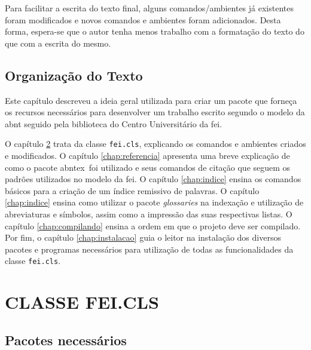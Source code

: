 \documentclass[xindy,draft]{fei}
\begin{document}
Para facilitar a escrita do texto final, alguns comandos/ambientes já existentes foram modificados e novos comandos e ambientes foram adicionados. Desta forma, espera-se que o autor tenha menos trabalho com a formatação do texto do que com a escrita do mesmo.

\section{Organização do Texto}

Este capítulo descreveu a ideia geral utilizada para criar um pacote que forneça os recursos necessários para desenvolver um trabalho escrito segundo o modelo da \gls{abnt} seguido pela biblioteca do Centro Universitário da \gls{fei}.

O capítulo \ref{chap:classe} trata da classe \texttt{fei.cls}, explicando os comandos e ambientes criados e modificados. O capítulo \ref{chap:referencia} apresenta uma breve explicação de como o pacote \gls{abntex}~foi utilizado e seus comandos de citação que seguem os padrões utilizados no modelo da \gls{fei}. O capítulo \ref{chap:indice} ensina os comandos básicos para a criação de um índice remissivo de palavras. O capítulo \ref{chap:indice} ensina como utilizar o pacote \emph{glossaries} na indexação e utilização de abreviaturas e símbolos, assim como a impressão das suas respectivas listas. O capítulo \ref{chap:compilando} ensina a ordem em que o projeto deve ser compilado. Por fim, o capítulo \ref{chap:instalacao} guia o leitor na instalação dos diversos pacotes e programas necessários para utilização de todas as funcionalidades da classe \texttt{fei.cls}.

\chapter{CLASSE FEI.CLS}\label{chap:classe}

\section{Pacotes necessários}\label{sec:pacotes}
    
\end{document}
